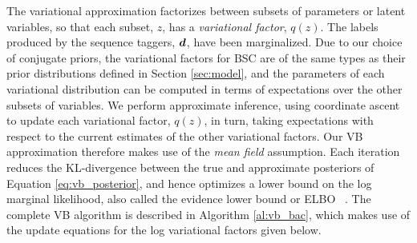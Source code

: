 %
The variational approximation factorizes between subsets of parameters or latent variables, so that each subset, $z$, has a \emph{variational factor}, $q(z)$. 
The labels produced by the sequence taggers, $\boldsymbol d$, have been marginalized.
Due to our choice of conjugate priors, the variational factors for BSC are of the same types
as their prior distributions defined in Section \ref{sec:model},
and the parameters of each variational distribution can be computed in terms  of 
expectations over the other subsets of variables.
We perform approximate inference,
using coordinate ascent to update each variational factor, $q(z)$, in turn,
taking expectations with respect to the current estimates of the other variational factors.
Our VB approximation therefore makes use of the \emph{mean field} assumption.
Each iteration reduces the KL-divergence between the true and approximate posteriors
of Equation \ref{eq:vb_posterior}, and hence optimizes a lower bound on the 
log marginal likelihood, also called the evidence lower bound or ELBO
~\cite{bishop_pattern_2007,attias_advances_2000}.
The complete VB algorithm is described in Algorithm \ref{al:vb_bac},
which makes use of the update equations for the log variational factors given below.
